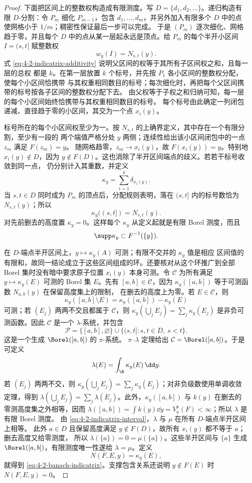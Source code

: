 \begin{proof}
下面把区间上的整数权构造成有限测度。写
$D=\{d_1,d_2,\ldots\}$。递归构造有限 $D$-分割：令 $P_m$ 细化 $P_{m-1}$，包含
$d_1,\ldots,d_m$，并另外加入有限多个 $D$ 中的点使网格小于 $1/m$；稠密性保证最后一步可以完成。
于是 $(P_m)$ 逐次细化、网格趋于零，并且每个 $D$ 中的点从某一层起永远是顶点。给 $P_m$ 的每个半开小区间
$I=(s,t]$ 赋整数权
\[
 w_y(I)=N_{s,t}(y).
\]
式 \eqref{eq:4-2-indicatrix-additivity} 说明父区间的权等于其所有子区间权之和，且每一层的总权
都是 $k$。在第一层放置 $k$ 个标号，并先按 $P_1$ 各小区间的整数权分配，使每个小区间恰携带
与其权重相同数目的标号；每次细化时，再把每个父区间携带的标号按各子区间的整数权分配下去。
由父权等于子权之和归纳可知，每一层的每个小区间始终恰携带与其权重相同数目的标号。
每个标号由此确定一列闭包递减、直径趋于零的小区间，其交为一个点 $x_i(y)$。

标号所在的每个小区间权至少为一。按 $N_{s,t}$ 的上确界定义，其中存在一个有限分割，至少有一段的
两个端值严格分处 $y$ 两侧；连续性给出该小区间闭包中的一点 $z_m$ 满足 $F(z_m)=y$。
随网格趋零，$z_m\to x_i(y)$，故 $F(x_i(y))=y$。特别地
$x_i(y)\notin D$，因为 $y\notin F(D)$。这也消除了半开区间端点的歧义。若若干标号收敛到同一点，
仍分别计入其重数，并定义
\[
 \kappa_y=\sum_{i=1}^k\delta_{x_i(y)}.
\]
当 $s,t\in D$ 同时成为 $P_m$ 的顶点后，分配规则表明，落在 $(s,t]$ 内的标号数恰为
$N_{s,t}(y)$；所以
\[
 \kappa_y((s,t])=N_{s,t}(y).
\]
对先前删去的高度置 $\kappa_y=0$。这样每个 $\kappa_y$ 从定义起就是有限 Borel 测度，而且
\[
 \supp\kappa_y\subset F^{-1}(\{y\}).
\]

在 $D$-端点半开区间上，$y\mapsto\kappa_y(A)$ 可测；有限不交并的 $\kappa_y$ 值是相应
区间值的有限和，故同一结论成立于这些区间组成的环。还要核对从这个环推广到全部
Borel 集时没有暗中要求原子位置 $x_i(y)$ 本身可测。令 $\mathcal C$ 为所有满足
$y\mapsto\kappa_y(E)$ 可测的 Borel 集 $E$。先有
$[a,b]\in\mathcal C$，因为 $\kappa_y([a,b])$ 等于可测函数 $N_{a,b}(y)$ 在保留高度集上的限制，
在删去的高度上为零。若 $E\in\mathcal C$，则
\[
 \kappa_y([a,b]\setminus E)=\kappa_y([a,b])-\kappa_y(E)
\]
可测；若 $(E_j)$ 两两不交且都属于 $\mathcal C$，则
$\kappa_y(\bigcup_jE_j)=\sum_j\kappa_y(E_j)$ 是非负可测函数。因此 $\mathcal C$ 是一个
$\lambda$-系统，并包含
\[
 \mathcal P=\{[a,b],\varnothing\}
 \cup\{(s,t]:s,t\in D,\ s<t\}.
\]
这是一个生成 $\Borel([a,b])$ 的 $\pi$-系统。
$\pi$--$\lambda$ 定理给出 $\mathcal C=\Borel([a,b])$。于是可定义
\[
 \lambda(E)=\int_\R\kappa_y(E)\,\dd y.
\]
若 $(E_j)$ 两两不交，则
$\kappa_y(\bigcup_jE_j)=\sum_j\kappa_y(E_j)$；对非负级数使用单调收敛定理，得到
$\lambda(\bigcup_jE_j)=\sum_j\lambda(E_j)$。此外，$\kappa_y([a,b])$ 与 $k(y)$ 在删去的
零测高度集之外相等，因而
$\lambda([a,b])=\int k(y)\dd y=V_a^b(F)<\infty$；所以 $\lambda$ 是有限 Borel 测度。
由 \eqref{eq:4-2-indicatrix-interval}，$\lambda$ 与 $\mu$ 在所有 $D$-端点半开区间上相等。
此外 $a\in D$ 且保留高度满足 $y\notin F(D)$，故所有 $x_i(y)$ 都不等于 $a$；删去高度又给零测度，
所以 $\lambda(\{a\})=0=\mu(\{a\})$。这些半开区间与 $\{a\}$ 生成
$\Borel([a,b])$，有限测度唯一性遂给 $\lambda=\mu$。定义
\[
 N(F,E,y)=\kappa_y(E),
\]
就得到 \eqref{eq:4-2-banach-indicatrix}。支撑包含关系还说明
$y\notin F(E)$ 时 $N(F,E,y)=0$。


\end{proof}
